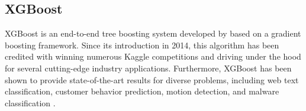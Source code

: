 \subsection{XGBoost}


XGBoost is an end-to-end tree boosting system developed by
\textcite{chen2016xgboost} based on a
gradient boosting framework. Since its introduction in 2014, this algorithm has
been credited with winning numerous Kaggle competitions and driving under the
hood for several cutting-edge industry applications. Furthermore, XGBoost has
been shown to provide state-of-the-art results for diverse problems, including
web text classification, customer behavior prediction, motion detection, and
malware classification \textcite{chen2016xgboost}.

